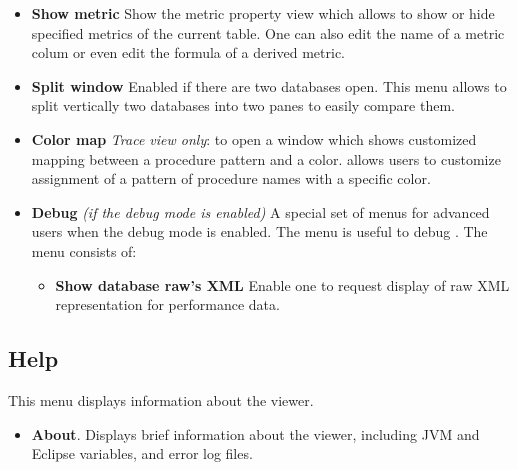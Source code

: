 \documentclass[english]{article}
\begin{document}
\begin{itemize}
 \item \textbf{Show metric}
Show the metric property view which allows to show or hide specified metrics of the current table.
One can also edit the name of a metric colum or even edit the formula of a derived metric.

 \item \textbf{Split window}
 Enabled if there are two databases open. This menu allows to split vertically two databases into two panes to easily compare them.

 \item \textbf{Color map} \emph{Trace view only}: to open a window which shows customized mapping between a procedure pattern and a color.  allows users to customize assignment of a pattern of procedure names with a specific color.

 \item \textbf{Debug} \emph{(if the debug mode is enabled)}
 A special set of menus for advanced users when the debug mode is enabled. The menu is useful to debug . The menu consists of:

   \begin{itemize}
     \item \textbf{Show database raw's XML}
 	Enable one to request display of raw XML representation for performance data.
  \end{itemize}

\end{itemize}


\subsection{Help}

This menu displays information about the viewer.
\begin{itemize}

\item \textbf{About}.
  Displays brief information about the viewer, including JVM and Eclipse variables, and error log files.

\end{itemize}



\end{document}
